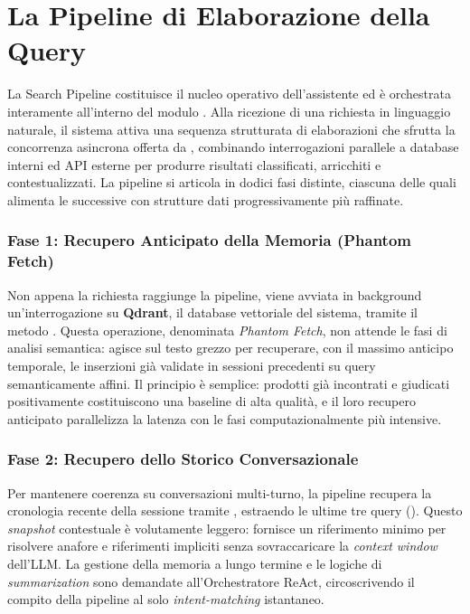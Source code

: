 \chapter{La Pipeline di Elaborazione della Query}

La Search Pipeline costituisce il nucleo operativo dell'assistente ed è
orchestrata interamente all'interno del modulo .
Alla ricezione di una richiesta in linguaggio naturale, il sistema attiva
una sequenza strutturata di elaborazioni che sfrutta la concorrenza asincrona
offerta da , combinando interrogazioni parallele a database
interni ed API esterne per produrre risultati classificati, arricchiti e
contestualizzati. La pipeline si articola in dodici fasi distinte, ciascuna
delle quali alimenta le successive con strutture dati progressivamente più
raffinate.

\subsection*{Fase 1: Recupero Anticipato della Memoria (Phantom Fetch)}
Non appena la richiesta raggiunge la pipeline, viene avviata in background
un'interrogazione su \textbf{Qdrant}, il database vettoriale del sistema,
tramite il metodo . Questa operazione, denominata
\emph{Phantom Fetch}, non attende le fasi di analisi semantica: agisce sul
testo grezzo per recuperare, con il massimo anticipo temporale, le inserzioni
già validate in sessioni precedenti su query semanticamente affini. Il
principio è semplice: prodotti già incontrati e giudicati positivamente
costituiscono una baseline di alta qualità, e il loro recupero anticipato
parallelizza la latenza con le fasi computazionalmente più intensive.

\subsection*{Fase 2: Recupero dello Storico Conversazionale}
Per mantenere coerenza su conversazioni multi-turno, la pipeline recupera
la cronologia recente della sessione tramite ,
estraendo le ultime tre query (). Questo \textit{snapshot}
contestuale è volutamente leggero: fornisce un riferimento minimo per
risolvere anafore e riferimenti impliciti senza sovraccaricare la
\textit{context window} dell'LLM. La gestione della memoria a lungo termine
e le logiche di \textit{summarization} sono demandate all'Orchestratore
ReAct, circoscrivendo il compito della pipeline al solo
\textit{intent-matching} istantaneo.

